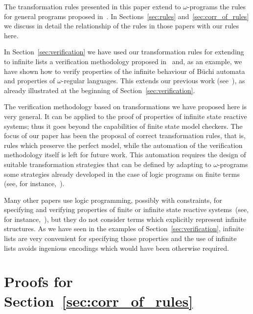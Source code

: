 \documentclass[english]{tlp}
\begin{document}
The transformation rules presented in this paper extend to 
$\omega$-programs the
rules for general programs proposed 
in~\cite{Fi&04a,PeP00a,Ro&02,Sek91,Sek09}. In 
Sections~\ref{sec:rules} and~\ref{sec:corr_of_rules}
we discuss in detail 
the relationship of the rules in those papers with our rules here.

In Section~\ref{sec:verification} we have used our transformation 
rules for extending to infinite lists a verification
methodology proposed in~\cite{PeP00a} 
and, as an example, we have shown how to verify
properties of the infinite behaviour of B\"uchi automata and 
properties of $\omega$-regular languages.
This extends our previous work (see~\cite{Pe&09b}), as already
illustrated at the beginning of Section~\ref{sec:verification}.

The verification methodology based on transformations we have 
proposed here is very general. It can be applied to the proof 
of properties of infinite state reactive systems; thus it goes 
beyond the capabilities of finite state model checkers.
The focus of our paper has been the proposal of correct 
transformation rules, that is, rules which preserve the
perfect model, while the automation of the verification 
methodology itself is 
left for future work.
This automation 
requires the design of suitable transformation strategies that can be 
defined by adapting to $\omega$-programs some strategies 
already developed in the case of logic programs on finite 
terms (see, for instance,~\cite{PrP95a,PeP00a}).

Many other papers use logic programming, possibly with constraints,
for specifying and verifying properties of finite or infinite state 
reactive systems~(see, 
for instance,~\cite{AbM89,DeP01,FrO97a,Ja&04,LeM99,NiL00,Ra&97}), but 
they do not consider terms which explicitly represent infinite
structures. As we have seen in the examples of Section~\ref{sec:verification}, 
infinite lists are very convenient for specifying those properties
and the use of infinite lists avoids
 ingenious encodings which would have been otherwise required.







\newpage

\appendix

\section{Proofs for Section~\ref{sec:corr_of_rules}}
\label{appendix:corr_of_rules}
\end{document}
